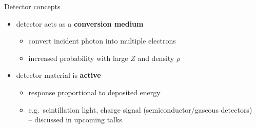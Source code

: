 \documentclass[11pt,xcolor=dvipsnames,professionalfonts]{beamer}
\begin{document}
\begin{frame}{Detector concepts}
		\begin{itemize}
			\setlength\itemsep{1.5em}
			
			\item detector acts as a \textbf{conversion medium} 
			\begin{itemize}
				\item convert incident photon into multiple electrons
				\item increased probability with large $Z$ and density $\rho$
			\end{itemize}
			
			\item detector material is \textbf{active}
			\begin{itemize}
				\item response proportional to deposited energy
				\item e.g.\ scintillation light, charge signal (semiconductor/gaseous detectors)\\
				 -- discussed in upcoming talks
			\end{itemize} 
		\end{itemize}			
\end{frame}

\end{document}
